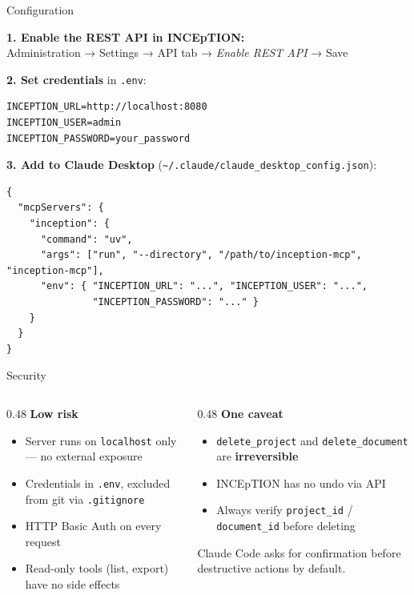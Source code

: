 \documentclass[aspectratio=169, 10pt]{beamer}
\begin{document}
\begin{frame}[fragile]{Configuration}

  \textbf{1. Enable the REST API in INCEpTION:}\\
  Administration → Settings → API tab → \textit{Enable REST API} → Save

  \bigskip
  \textbf{2. Set credentials} in \texttt{.env}:
  \begin{lstlisting}
INCEPTION_URL=http://localhost:8080
INCEPTION_USER=admin
INCEPTION_PASSWORD=your_password
  \end{lstlisting}

  \bigskip
  \textbf{3. Add to Claude Desktop} (\texttt{\textasciitilde/.claude/claude\_desktop\_config.json}):
  \begin{lstlisting}[basicstyle=\ttfamily\scriptsize]
{
  "mcpServers": {
    "inception": {
      "command": "uv",
      "args": ["run", "--directory", "/path/to/inception-mcp", "inception-mcp"],
      "env": { "INCEPTION_URL": "...", "INCEPTION_USER": "...",
               "INCEPTION_PASSWORD": "..." }
    }
  }
}
  \end{lstlisting}
\end{frame}

\begin{frame}{Security}

  \begin{columns}
    \begin{column}{0.48\textwidth}
      \textbf{\textcolor{inc-green}{Low risk}}
      \begin{itemize}
        \item Server runs on \texttt{localhost} only — no external exposure
        \item Credentials in \texttt{.env}, excluded from git via \texttt{.gitignore}
        \item HTTP Basic Auth on every request
        \item Read-only tools (list, export) have no side effects
      \end{itemize}
    \end{column}
    \begin{column}{0.48\textwidth}
      \textbf{\textcolor{inc-orange}{One caveat}}
      \begin{itemize}
        \item \texttt{delete\_project} and \texttt{delete\_document} are \textbf{irreversible}
        \item INCEpTION has no undo via API
        \item Always verify \texttt{project\_id} / \texttt{document\_id} before deleting
      \end{itemize}

      \bigskip
      \footnotesize
      Claude Code asks for confirmation before destructive actions by default.
    \end{column}
  \end{columns}
\end{frame}
\end{document}
